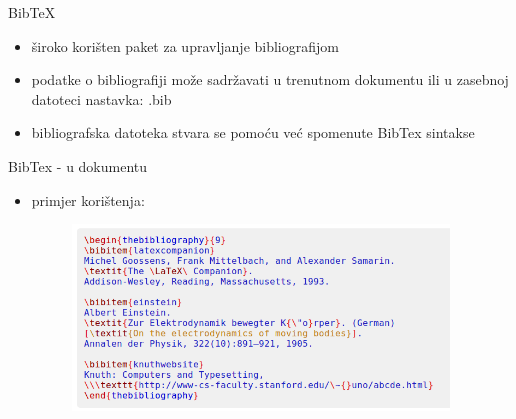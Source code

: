 \documentclass{beamer}
\begin{document}
\begin{frame}{BibTeX}
\begin{itemize}
    \item široko korišten paket za upravljanje bibliografijom \\
    \item podatke o bibliografiji može sadržavati u trenutnom 
    dokumentu ili u zasebnoj datoteci nastavka: .bib \\
    \item bibliografska datoteka stvara se pomoću već spomenute
    BibTex sintakse \\
\end{itemize}
\end{frame}

\begin{frame}{BibTex - u dokumentu}
\begin{itemize}
    \item primjer korištenja:
    \begin{figure}
    \includegraphics[width=10cm]{bibtexUDokumentu.png}
    \end{figure}
\end{itemize}    
\end{frame}
\end{document}
